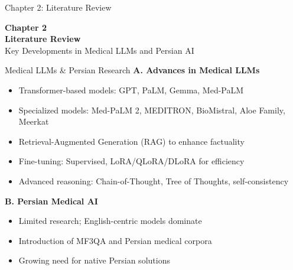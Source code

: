 
\begin{frame}{Chapter 2: Literature Review}
    \begin{center}
        \Large{\textbf{Chapter 2}}\\
        \vspace{0.5em}
        \huge{\textbf{Literature Review}}\\
        \vspace{0.5em}
        \large{Key Developments in Medical LLMs and Persian AI}
    \end{center}
\end{frame}

\begin{frame}{Medical LLMs \& Persian Research}
    \textbf{A. Advances in Medical LLMs}
    \begin{itemize}
        \item Transformer-based models: GPT, PaLM, Gemma, Med-PaLM
        \item Specialized models: Med-PaLM 2, MEDITRON, BioMistral, Aloe Family, Meerkat
        \item Retrieval-Augmented Generation (RAG) to enhance factuality
        \item Fine-tuning: Supervised, LoRA/QLoRA/DLoRA for efficiency
        \item Advanced reasoning: Chain-of-Thought, Tree of Thoughts, self-consistency
    \end{itemize}
    \vspace{0.5em}
    \textbf{B. Persian Medical AI}
    \begin{itemize}
        \item Limited research; English-centric models dominate
        \item Introduction of MF3QA and Persian medical corpora
        \item Growing need for native Persian solutions
    \end{itemize}
\end{frame}

